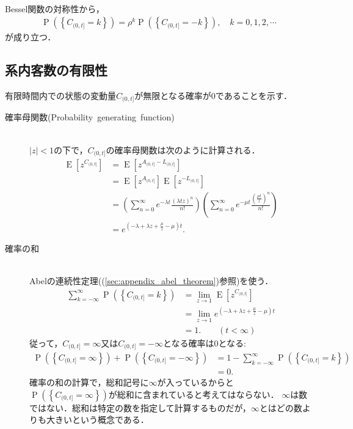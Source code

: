 \documentclass[a4j,papersize,disablejfam,slide,14pt]{jsarticle}
\def\Exp#1{\operatorname{E} \left[ #1 \right]} %
\def\exp#1{e^{#1}} %
\def\prob#1{\operatorname{P} \left(\left\{ #1 \right\}\right)} %
\begin{document}
    \mbox{}\\
    {\rm Bessel}関数の対称性から，
    \begin{align}
    	\prob{C_{(0, t]} = k} = \rho^{k} \prob{C_{(0, t]} = -k}, \quad k=0,1,2,\cdots \label{eq:bessel_symmetry_2}
    \end{align}
    が成り立つ．

\subsection{系内客数の有限性}
	有限時間内での状態の変動量$C_{(0, t]}$が無限となる確率が$0$であることを示す．
    \begin{description}
    	\item[確率母関数{\rm (Probability\ generating\ function)}]\mbox{}\\
        	$|z| < 1$の下で，$C_{(0, t]}$の確率母関数は次のように計算される．
            \begin{align}
            	\Exp{z^{C_{(0, t]}}} &= \Exp{z^{A_{(0, t]} - L_{(0, t]}}} \\
                &= \Exp{z^{A_{(0, t]}}}\Exp{z^{-L_{(0, t]}}} \\
                &= \left(\sum_{n=0}^{\infty} \exp{-\lambda t} \frac{(\lambda t z)^n}{n!} \right)
                	\left(\sum_{n=0}^{\infty} \exp{-\mu t} \frac{(\frac{\mu t}{z})^n}{n!} \right) \\
                &= \exp{(-\lambda + \lambda z + \frac{\mu}{z} -\mu)t}.
            \end{align}
        \item[確率の和]\mbox{}\\
        	{\rm Abel}の連続性定理((\ref{sec:appendix_abel_theorem})参照)を使う．
        	\begin{align}
            	\sum_{k=-\infty}^{\infty} \prob{C_{(0, t]} = k} &= \lim_{z \to 1} \Exp{z^{C_{(0, t]}}} \\
                &= \lim_{z \to 1} \exp{(-\lambda + \lambda z + \frac{\mu}{z} -\mu)t} \\
                &= 1. \qquad (t < \infty) \label{eq:sum_prob_change}
            \end{align}
            従って，$C_{(0, t]} = \infty$又は$C_{(0, t]} = -\infty$となる確率は$0$となる:
            \begin{align}
                \prob{C_{(0, t]} = \infty} + \prob{C_{(0, t]} = -\infty} &= 1 - \sum_{k=-\infty}^{\infty} \prob{C_{(0, t]} = k} \\
                &= 0.
            \end{align}
            確率の和の計算で，総和記号に$\infty$が入っているからと$\prob{C_{(0, t]} = \infty}$が総和に含まれていると考えてはならない．
            $\infty$は数ではない．総和は特定の数を指定して計算するものだが，$\infty$とはどの数よりも大きいという概念である．
    \end{description}
\end{document}
